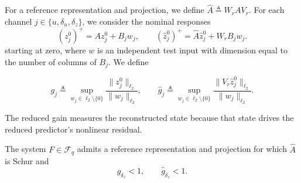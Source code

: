 \documentclass{l4dc2027}
\newcommand{\eqdef}{\triangleq}
\begin{document}
\begin{definition}\label{def:autonomous-gains}
For a reference representation and projection, we define \mbox{$\widehat A\eqdef W_rAV_r$}.
For each channel \mbox{$j\in\{u,\delta_u,\delta_z\}$}, we consider the nominal responses
\[
 (z_j^0)^+=Az_j^0+B_jw_j,\qquad
 (\widehat z_j^0)^+=\widehat A\widehat z_j^0+W_rB_jw_j.
\]
starting at zero, where \mbox{$w$} is an independent test input with dimension equal to the number of columns of \mbox{$B_j$}.
We define

\[
 g_j\eqdef\sup_{w_j\in\ell_2\setminus\{0\}}
 \frac{\|z_j^0\|_{\ell_2}}{\|w_j\|_{\ell_2}},
 \qquad
 \widehat g_j\eqdef\sup_{w_j\in\ell_2\setminus\{0\}}
 \frac{\|V_r\widehat z_j^0\|_{\ell_2}}{\|w_j\|_{\ell_2}}.
\]
\end{definition}
The reduced gain measures the reconstructed state because that state drives the reduced predictor's nonlinear residual.

\begin{assumption}\label{ass:reference}
The system \mbox{$F\in\mathcal F_q$} admits a reference representation and projection for which \mbox{$\widehat A$} is Schur and
\begin{equation}\label{eq:reference-margin}
 g_{\delta_z}<1,\qquad\widehat g_{\delta_z}<1.
\end{equation}
\end{assumption}

\noindent{}
\end{document}
